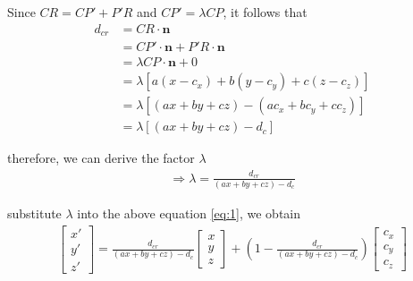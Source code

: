 \documentclass[11pt]{article}  %
\begin{document}
    Since $CR=CP'+P'R$ and $CP'=\lambda CP$, it follows that
    \begin{align*}
        d_{cr} &= CR \cdot \bm{n}\\
        &= CP'\cdot \bm{n}+P'R\cdot \bm{n}\\
        &= \lambda CP \cdot \bm{n} + 0\\
        &= \lambda [a(x-c_x)+b(y-c_y)+c(z-c_z)]\\
        &= \lambda [(ax+by+cz)-(ac_x+bc_y+cc_z)]\\
        &= \lambda [(ax+by+cz)-d_c]
    \end{align*}
    
    therefore, we can derive the factor $\lambda$
    \begin{align*}
        \Rightarrow\lambda=\frac{d_{cr}}{(ax+by+cz)-d_c}
    \end{align*}
    
    substitute $\lambda$ into the above equation \eqref{eq:1}, we obtain \vspace{1mm}
    \begin{align*}
        \begin{bmatrix}
            x'\\y'\\z'
        \end{bmatrix}
        =\frac{d_{cr}}{(ax+by+cz)-d_c}
        \begin{bmatrix}
            x\\y\\z
        \end{bmatrix}
        +(1-\frac{d_{cr}}{(ax+by+cz)-d_c})
        \begin{bmatrix}
            c_x\\c_y\\c_z
        \end{bmatrix}
    \end{align*}
    
\end{document}
